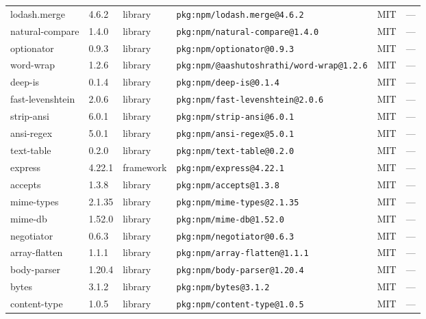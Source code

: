 \documentclass[11pt,a4paper]{article}
\begin{document}
\begin{longtable}{|p{4cm}|p{2cm}|p{1.6cm}|p{5cm}|p{1.5cm}|p{3.5cm}|}
\raggedright lodash.merge & 4.6.2 & library & \small\texttt{pkg:npm/lodash.merge@4.6.2} & MIT & \small — \\
\raggedright natural-compare & 1.4.0 & library & \small\texttt{pkg:npm/natural-compare@1.4.0} & MIT & \small — \\
\raggedright optionator & 0.9.3 & library & \small\texttt{pkg:npm/optionator@0.9.3} & MIT & \small — \\
\raggedright word-wrap & 1.2.6 & library & \small\texttt{pkg:npm/@aashutoshrathi/word-wrap@1.2.6} & MIT & \small — \\
\raggedright deep-is & 0.1.4 & library & \small\texttt{pkg:npm/deep-is@0.1.4} & MIT & \small — \\
\raggedright fast-levenshtein & 2.0.6 & library & \small\texttt{pkg:npm/fast-levenshtein@2.0.6} & MIT & \small — \\
\raggedright strip-ansi & 6.0.1 & library & \small\texttt{pkg:npm/strip-ansi@6.0.1} & MIT & \small — \\
\raggedright ansi-regex & 5.0.1 & library & \small\texttt{pkg:npm/ansi-regex@5.0.1} & MIT & \small — \\
\raggedright text-table & 0.2.0 & library & \small\texttt{pkg:npm/text-table@0.2.0} & MIT & \small — \\
\raggedright express & 4.22.1 & framework & \small\texttt{pkg:npm/express@4.22.1} & MIT & \small — \\
\raggedright accepts & 1.3.8 & library & \small\texttt{pkg:npm/accepts@1.3.8} & MIT & \small — \\
\raggedright mime-types & 2.1.35 & library & \small\texttt{pkg:npm/mime-types@2.1.35} & MIT & \small — \\
\raggedright mime-db & 1.52.0 & library & \small\texttt{pkg:npm/mime-db@1.52.0} & MIT & \small — \\
\raggedright negotiator & 0.6.3 & library & \small\texttt{pkg:npm/negotiator@0.6.3} & MIT & \small — \\
\raggedright array-flatten & 1.1.1 & library & \small\texttt{pkg:npm/array-flatten@1.1.1} & MIT & \small — \\
\raggedright body-parser & 1.20.4 & library & \small\texttt{pkg:npm/body-parser@1.20.4} & MIT & \small — \\
\raggedright bytes & 3.1.2 & library & \small\texttt{pkg:npm/bytes@3.1.2} & MIT & \small — \\
\raggedright content-type & 1.0.5 & library & \small\texttt{pkg:npm/content-type@1.0.5} & MIT & \small — \\

\end{longtable}
\end{document}
